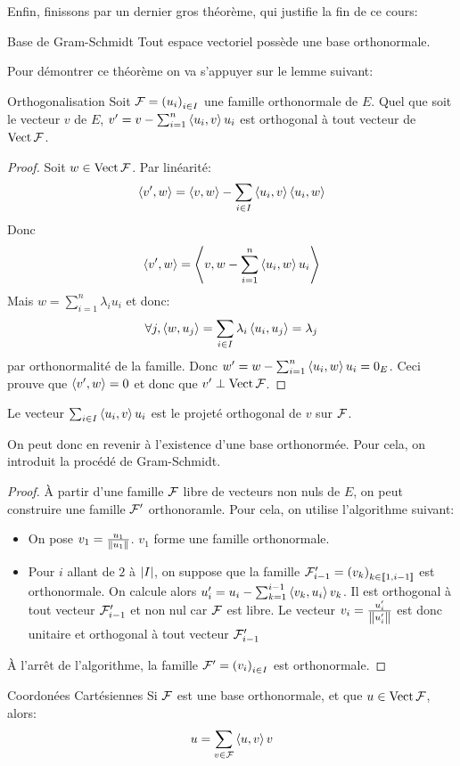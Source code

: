\documentclass{classe}
\begin{document}
Enfin, finissons par un dernier gros théorème, qui justifie la fin de ce cours:
\begin{théorème}{Base de Gram-Schmidt}{}
	Tout espace vectoriel possède une base orthonormale.
\end{théorème}
Pour démontrer ce théorème on va s'appuyer sur le lemme suivant:
\begin{lemme}{Orthogonalisation}{}
	Soit $\mathcal{F} = \left( u_{i} \right)_{i\in I}$ une famille orthonormale de $E$. Quel que soit le vecteur $v$ de $E$, $v' = v - \sum_{i = 1}^{n}\left\langle u_{i}, v \right\rangle u_{i}$ est orthogonal à tout vecteur de $\operatorname{Vect} \mathcal{F}$.
\end{lemme}
\begin{proof}
	Soit $w \in \operatorname{Vect} \mathcal{F}$.
	Par linéarité:
	\begin{equation*}
		\left\langle v', w \right\rangle = \left\langle v, w \right\rangle - \sum_{i \in I}\left\langle u_{i}, v \right\rangle\left\langle u_{i}, w \right\rangle
	\end{equation*}
	Donc
	\begin{equation*}
		\left\langle v', w \right\rangle = \left\langle v, w - \sum_{i = 1}^{n}\left\langle u_{i}, w \right\rangle u_{i} \right\rangle
	\end{equation*}
	Mais $w = \sum_{i = 1}^{n}\lambda_{i}u_{i}$ et donc:
	\begin{equation*}
		\forall j, \left\langle w, u_{j} \right\rangle = \sum_{i \in I}\lambda_{i}\left\langle u_{i}, u_{j} \right\rangle = \lambda_{j}
	\end{equation*}
	par orthonormalité de la famille.
	Donc $w' = w - \sum_{i = 1}^{n}\left\langle u_{i}, w \right\rangle u_{i} = 0_{E}$.
	Ceci prouve que $\left\langle v', w \right\rangle = 0$ et donc que $v' \perp \operatorname{Vect} \mathcal{F}$.
\end{proof}

\begin{remarque}
	Le vecteur $\sum_{i \in I}\left\langle u_{i}, v \right\rangle u_{i}$ est le projeté orthogonal de $v$ sur $\mathcal{F}$.
\end{remarque}

On peut donc en revenir à l'existence d'une base orthonormée. Pour cela, on introduit la procédé de Gram-Schmidt.
\begin{proof}
	À partir d'une famille $\mathcal{F}$ libre de vecteurs non nuls de $E$, on peut construire une famille $\mathcal{F}'$ orthonoramle.
	Pour cela, on utilise l'algorithme suivant:
	\begin{itemize}
		\item On pose $v_{1} = \frac{u_{1}}{\left\lVert u_{1} \right\rVert}$. $v_{1}$ forme une famille orthonormale.
		\item Pour $i$ allant de $2$ à $\left|I\right|$, on suppose que la famille $\mathcal{F}'_{i - 1} = \left( v_{k} \right)_{k \in \left\llbracket 1, i - 1\right\rrbracket}$ est orthonormale.
			On calcule alors $u_{i}' = u_{i} - \sum_{k = 1}^{i - 1}\left\langle v_{k}, u_{i} \right\rangle v_{k}$.
			Il est orthogonal à tout vecteur $\mathcal{F}'_{i - 1}$ et non nul car $\mathcal{F}$ est libre.
		Le vecteur $v_{i} = \frac{u_{i}'}{\left\lVert u_{i}' \right\rVert}$ est donc unitaire et orthogonal à tout vecteur $\mathcal{F}'_{i - 1}$
	\end{itemize}
	À l'arrêt de l'algorithme, la famille $\mathcal{F}' = \left( v_{i} \right)_{i \in I}$ est orthonormale.
\end{proof}

\begin{corollaire}{Coordonées Cartésiennes}{}
	Si $\mathcal{F}$ est une base orthonormale, et que $u \in \operatorname{Vect} \mathcal{F}$, alors:
	\begin{equation*}
		u = \sum_{v\in \mathcal{F}}\left\langle u, v \right\rangle v
	\end{equation*}
\end{corollaire}
\end{document}
